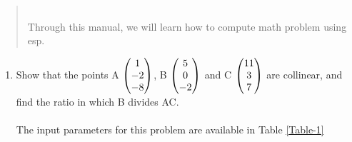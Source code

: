 \begin{abstract}\\
Through this manual, we will learn how to compute math problem using esp.
\end{abstract}

\begin{enumerate}[label=\thesection.\arabic*.,ref=\thesection.\theenumi]

	\item Show that the points A $\begin{pmatrix}1\\-2\\-8\end{pmatrix}$, B $\begin{pmatrix}5\\0\\-2\end{pmatrix}$ and C $\begin{pmatrix}11\\3\\7\end{pmatrix}$ are collinear, and find the ratio in which B divides AC.\\


\solution \\The input parameters for this problem are available in Table \ref{Table-1}
\begin{table}[ht!]

\caption{}
\label{Table-1}	

\end{table}


\end{enumerate}
